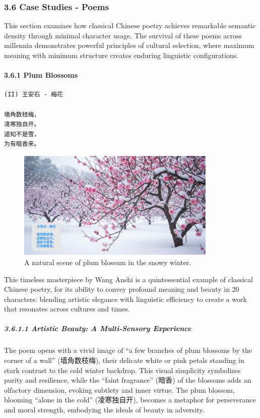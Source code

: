 \documentclass[
  11pt,
  letterpaper,
]{article}
\begin{document}
\subsubsection{3.6 Case Studies - Poems}\label{case-studies---poems}

This section examines how classical Chinese poetry achieves remarkable
semantic density through minimal character usage. The survival of these
poems across millennia demonstrates powerful principles of cultural
selection, where maximum meaning with minimum structure creates enduring
linguistic configurations.

\paragraph{3.6.1 Plum Blossoms}\label{plum-blossoms}

\begin{verbatim}
(II) 王安石 - 梅花

墙角数枝梅，
凌寒独自开。
遥知不是雪，
为有暗香来。
\end{verbatim}

\begin{figure}
\centering
\includegraphics[width=0.85\textwidth]{./images/poem_plum.png}
\caption{A natural scene of plum blossum in the snowy winter.}
\end{figure}

This timeless masterpiece by Wang Anshi is a quintessential example of
classical Chinese poetry, for its ability to convey profound meaning and
beauty in 20 characters: blending artistic elegance with linguistic
efficiency to create a work that resonates across cultures and times.

\subparagraph{3.6.1.1 Artistic Beauty: A Multi-Sensory
Experience}\label{artistic-beauty-a-multi-sensory-experience}

The poem opens with a vivid image of ``a few branches of plum blossoms
by the corner of a wall'' (墙角数枝梅), their delicate white or pink
petals standing in stark contrast to the cold winter backdrop. This
visual simplicity symbolizes purity and resilience, while the ``faint
fragrance'' (暗香) of the blossoms adds an olfactory dimension, evoking
subtlety and inner virtue. The plum blossom, blooming ``alone in the
cold'' (凌寒独自开), becomes a metaphor for perseverance and moral
strength, embodying the ideals of beauty in adversity.
\end{document}
